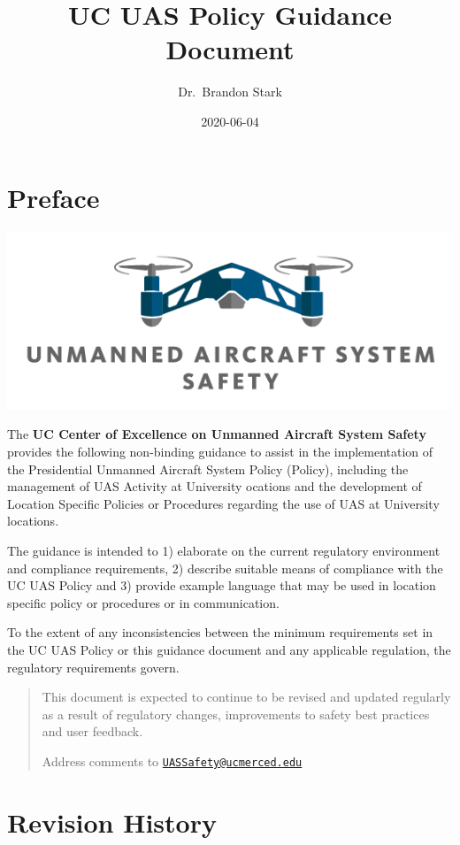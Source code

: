 \documentclass[
]{book}
\title{UC UAS Policy Guidance Document}
\author{Dr.~Brandon Stark}
\date{2020-06-04}
\begin{document}
\maketitle

{
\setcounter{tocdepth}{1}
\tableofcontents
}
\hypertarget{preface}{%
\chapter*{Preface}\label{preface}}

\begin{center}\includegraphics[width=0.5\linewidth]{images/COE_logo} \end{center}

The \textbf{UC Center of Excellence on Unmanned Aircraft System Safety} provides the following non-binding guidance to assist in the implementation of the Presidential Unmanned Aircraft System Policy (Policy), including the management of UAS Activity at University ocations and the development of Location Specific Policies or Procedures regarding the use of UAS at University locations.

The guidance is intended to 1) elaborate on the current regulatory environment and compliance requirements, 2) describe suitable means of compliance with the UC UAS Policy and 3) provide example language that may be used in location specific policy or procedures or in communication.

To the extent of any inconsistencies between the minimum requirements set in the UC UAS Policy or this guidance document and any applicable regulation, the regulatory requirements govern.

\begin{quote}
This document is expected to continue to be revised and updated regularly as a result of regulatory changes, improvements to safety best practices and user feedback.

Address comments to \href{mailto:UASSafety@ucmerced.edu}{\nolinkurl{UASSafety@ucmerced.edu}}
\end{quote}

\hypertarget{revision-history}{%
\chapter*{Revision History}\label{revision-history}}
\end{document}
